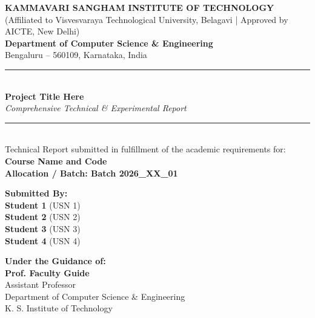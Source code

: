 \documentclass[12pt,a4paper]{report}
\newcommand{\ProjectTitle}{Project Title Here}
\newcommand{\ProjectSubtitle}{Comprehensive Technical \& Experimental Report}
\newcommand{\CourseName}{Course Name and Code}
\newcommand{\BatchID}{Batch 2026\_XX\_01}
\newcommand{\InstitutionName}{KAMMAVARI SANGHAM INSTITUTE OF TECHNOLOGY}
\newcommand{\InstitutionShort}{K. S. Institute of Technology}
\newcommand{\InstitutionAffiliation}{(Affiliated to Visvesvaraya Technological University, Belagavi | Approved by AICTE, New Delhi)}
\newcommand{\DepartmentName}{Department of Computer Science \& Engineering}
\newcommand{\CityLocation}{Bengaluru -- 560109, Karnataka, India}
\begin{document}
\pagestyle{preliminary}

\begin{titlepage}
\begin{center}
    {\fontsize{15}{18}\bfseries \InstitutionName}\\[0.3em]
    {\fontsize{9.5}{12}\selectfont \InstitutionAffiliation}\\[0.5em]
    {\fontsize{11}{14}\bfseries \DepartmentName}\\[0.2em]
    {\fontsize{10}{13}\selectfont \CityLocation}\\[1.5em]

    {\color{primarybrand}\rule{\textwidth}{1.8pt}}\\[1.8em]

    {\fontsize{18}{22}\bfseries \ProjectTitle}\\[0.8em]
    {\fontsize{12}{15}\selectfont\textit{\ProjectSubtitle}}\\[1.2em]

    {\color{primarybrand}\rule{\textwidth}{1.8pt}}\\[2em]

    {\fontsize{11}{14}\selectfont Technical Report submitted in fulfillment of the academic requirements for:}\\[0.5em]
    {\fontsize{12}{15}\bfseries \CourseName}\\[0.3em]
    {\fontsize{11}{14}\bfseries Allocation / Batch: \BatchID}\\[2.5em]

    \begin{minipage}{0.48\textwidth}
        \begin{flushleft}
            \textbf{Submitted By:}\\[0.4em]
            \textbf{Student 1} (USN 1)\\[0.2em]
            \textbf{Student 2} (USN 2)\\[0.2em]
            \textbf{Student 3} (USN 3)\\[0.2em]
            \textbf{Student 4} (USN 4)
        \end{flushleft}
    \end{minipage}
    \hfill
    \begin{minipage}{0.48\textwidth}
        \begin{flushright}
            \textbf{Under the Guidance of:}\\[0.4em]
            \textbf{Prof. Faculty Guide}\\[0.2em]
            Assistant Professor\\[0.2em]
            \DepartmentName\\[0.2em]
            \InstitutionShort
        \end{flushright}
    \end{minipage}


\end{center}
\end{titlepage}
\end{document}
